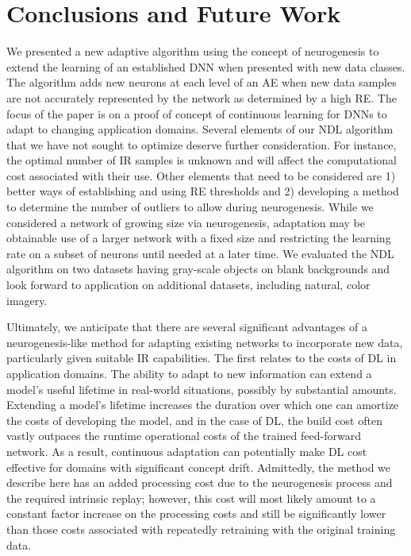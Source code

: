 \documentclass[10pt,conference]{IEEEtran}
\begin{document}
\section{Conclusions and Future Work}
We presented a new adaptive algorithm using the concept of neurogenesis to extend the learning of an established DNN when presented with new data classes. The algorithm adds new neurons at each level of an AE when new data samples are not accurately represented by the network as determined by a high RE. The focus of the paper is on a proof of concept of continuous learning for DNNs to adapt to changing application domains. Several elements of our NDL algorithm that we have not sought to optimize deserve further consideration. For instance, the optimal number of IR samples is unknown and will affect the computational cost associated with their use. Other elements that need to be considered are 1) better ways of establishing and using RE thresholds and 2) developing a method to determine the number of outliers to allow during neurogenesis. While we considered a network of growing size via neurogenesis, adaptation may be obtainable use of a larger network with a fixed size and restricting the learning rate on a subset of neurons until needed at a later time. We evaluated the NDL algorithm on two datasets having gray-scale objects on blank backgrounds and look forward to application on additional datasets, including natural, color imagery.

Ultimately, we anticipate that there are several significant advantages of a neurogenesis-like method for adapting existing networks to incorporate new data, particularly given suitable IR capabilities. The first relates to the costs of DL in application domains. The ability to adapt to new information can extend a model's useful lifetime in real-world situations, possibly by substantial amounts. Extending a model's lifetime increases the duration over which one can amortize the costs of developing the model, and in the case of DL, the build cost often vastly outpaces the runtime operational costs of the trained feed-forward network. As a result, continuous adaptation can potentially make DL cost effective for domains with significant concept drift. Admittedly, the method we describe here has an added processing cost due to the neurogenesis process and the required intrinsic replay; however, this cost will most likely amount to a constant factor increase on the processing costs and still be significantly lower than those costs associated with repeatedly retraining with the original training data. 
\end{document}
